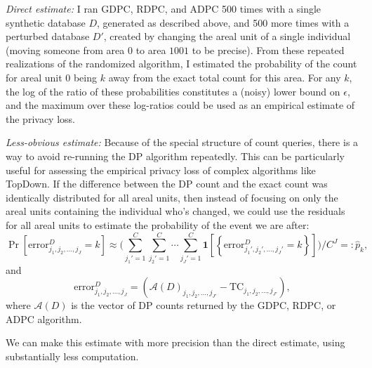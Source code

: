 \documentclass{article}
\begin{document}
\emph{Direct estimate:} I ran GDPC, RDPC, and ADPC 500 times with a single synthetic database $D$, generated as described above, and 500 more times with a perturbed database $D'$, created by changing the areal unit of a single individual (moving someone from area $0$ to area $1001$ to be precise). From these repeated realizations of the randomized algorithm, I estimated the probability of the count for areal unit $0$ being $k$ away from the exact total count for this area.  For any $k$, the log of the ratio of these probabilities constitutes a (noisy) lower bound on $\epsilon$, and the maximum over these log-ratios could be used as an empirical estimate of the privacy loss.


\emph{Less-obvious estimate:} Because of the special structure of count queries, there is a way to avoid re-running the DP algorithm repeatedly.  This can be particularly useful for assessing the empirical privacy loss of complex algorithms like TopDown. If the difference between the DP count and the exact count was identically distributed for all areal units, then instead of focusing on only the areal units containing the individual who's changed, we could use the residuals for all areal units to estimate the probability of the event we are after:
$$\Pr\left[\mathrm{error}_{j_1, j_2, \ldots, j_{J}}^D
= k\right]
\approx
\bigg(\sum_{j_1'=1}^C\sum_{j_2'=1}^C\cdots\sum_{j_J' = 1}^C \mathbf{1}\left[\left\{\mathrm{error}_{j_1', j_2', \ldots, j_{J}'}^D
= k\right\}\right]\bigg)\bigg/C^J =: \hat{p}_k,
$$
and $$\mathrm{error}_{j_1, j_2, \ldots, j_{J}}^D = \left(\mathcal{A}(D)_{j_1, j_2, \ldots, j_{J'}}
- \mathrm{TC}_{j_1, j_2, \ldots, j_{J'}}\right),$$
where $\mathcal{A}(D)$ is the vector of DP counts returned by the GDPC, RDPC, or ADPC algorithm.

We can make this estimate with more precision than the direct estimate, using substantially less computation.
\end{document}

